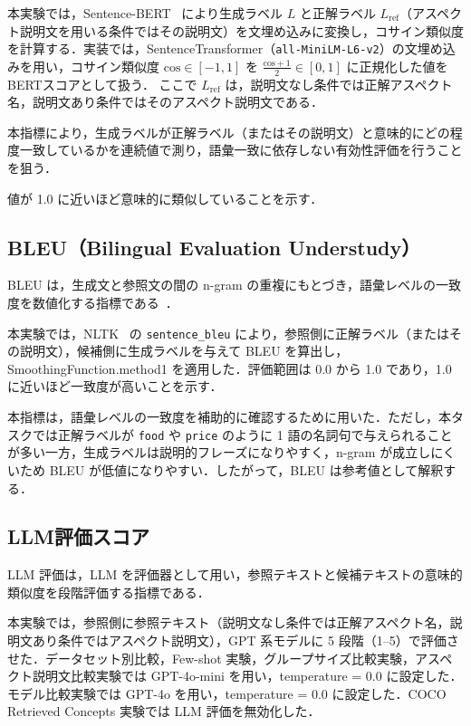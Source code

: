 本実験では，Sentence-BERT~\cite{reimers2019sentence} により生成ラベル $L$ と正解ラベル $L_{\mathrm{ref}}$（アスペクト説明文を用いる条件ではその説明文）を文埋め込みに変換し，コサイン類似度を計算する．実装では，SentenceTransformer（\texttt{all-MiniLM-L6-v2}）の文埋め込みを用い，コサイン類似度 $\mathrm{cos} \in [-1, 1]$ を $\frac{\mathrm{cos}+1}{2} \in [0, 1]$ に正規化した値を BERTスコアとして扱う．
ここで $L_{\mathrm{ref}}$ は，説明文なし条件では正解アスペクト名，説明文あり条件ではそのアスペクト説明文である．

本指標により，生成ラベルが正解ラベル（またはその説明文）と意味的にどの程度一致しているかを連続値で測り，語彙一致に依存しない有効性評価を行うことを狙う．

値が 1.0 に近いほど意味的に類似していることを示す．

\subsection{BLEU（Bilingual Evaluation Understudy）}
BLEU は，生成文と参照文の間の n-gram の重複にもとづき，語彙レベルの一致度を数値化する指標である~\cite{papineni-etal-2002-bleu}．

本実験では，NLTK~\cite{bird2009natural} の \texttt{sentence\_bleu} により，参照側に正解ラベル（またはその説明文），候補側に生成ラベルを与えて BLEU を算出し，SmoothingFunction.method1 を適用した．評価範囲は 0.0 から 1.0 であり，1.0 に近いほど一致度が高いことを示す．

本指標は，語彙レベルの一致度を補助的に確認するために用いた．ただし，本タスクでは正解ラベルが \texttt{food} や \texttt{price} のように 1 語の名詞句で与えられることが多い一方，生成ラベルは説明的フレーズになりやすく，n-gram が成立しにくいため BLEU が低値になりやすい．したがって，BLEU は参考値として解釈する．

\subsection{LLM評価スコア}
\label{subsec:llm_eval_score}
LLM 評価は，LLM を評価器として用い，参照テキストと候補テキストの意味的類似度を段階評価する指標である．

本実験では，参照側に参照テキスト（説明文なし条件では正解アスペクト名，説明文あり条件ではアスペクト説明文），GPT 系モデルに 5 段階（1--5）で評価させた．データセット別比較，Few-shot 実験，グループサイズ比較実験，アスペクト説明文比較実験では GPT-4o-mini を用い，temperature = 0.0 に設定した．モデル比較実験では GPT-4o を用い，temperature = 0.0 に設定した．COCO Retrieved Concepts 実験では LLM 評価を無効化した．

